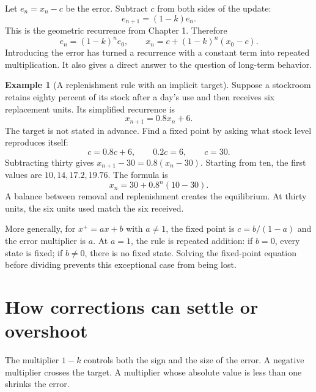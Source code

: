 \documentclass[11pt,oneside,openany]{book}
\theoremstyle{definition}
\newtheorem{example}{Example}[chapter]
\theoremstyle{remark}
\numberwithin{equation}{chapter}
\begin{document}
Let \(e_n=x_n-c\) be the error. Subtract \(c\) from both sides of the update: \[e_{n+1}=(1-k)e_n.\] This is the geometric recurrence from Chapter 1. Therefore \[e_n=(1-k)^n e_0,\qquad
\boxed{x_n=c+(1-k)^n(x_0-c).}\] Introducing the error has turned a recurrence with a constant term into repeated multiplication. It also gives a direct answer to the question of long-term behavior.

\begin{example}[A replenishment rule with an implicit target]

Suppose a stockroom retains eighty percent of its stock after a day's use and then receives six replacement units. Its simplified recurrence is \[x_{n+1}=0.8x_n+6.\] The target is not stated in advance. Find a fixed point by asking what stock level reproduces itself: \[c=0.8c+6,\qquad 0.2c=6,\qquad c=30.\] Subtracting thirty gives \(x_{n+1}-30=0.8(x_n-30)\). Starting from ten, the first values are \(10,14,17.2,19.76\). The formula is \[x_n=30+0.8^n(10-30).\] A balance between removal and replenishment creates the equilibrium. At thirty units, the six units used match the six received.

\end{example}

More generally, for \(x^+=ax+b\) with \(a\ne1\), the fixed point is \(c=b/(1-a)\) and the error multiplier is \(a\). At \(a=1\), the rule is repeated addition: if \(b=0\), every state is fixed; if \(b\ne0\), there is no fixed state. Solving the fixed-point equation before dividing prevents this exceptional case from being lost.

\section{How corrections can settle or overshoot}\label{ch02-how-corrections-can-settle-or-overshoot}

The multiplier \(1-k\) controls both the sign and the size of the error. A negative multiplier crosses the target. A multiplier whose absolute value is less than one shrinks the error.
\end{document}
